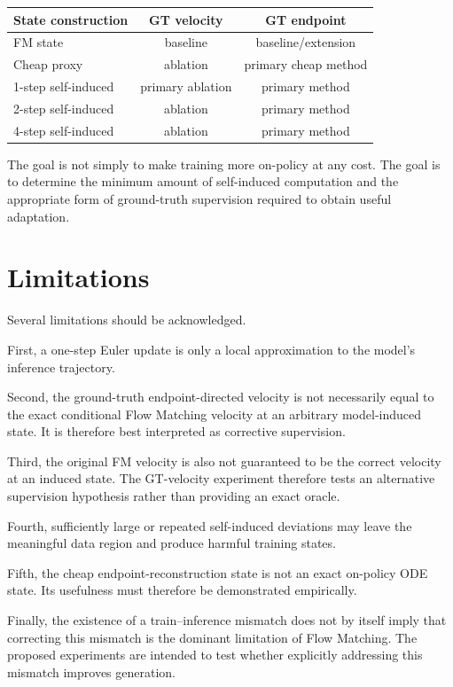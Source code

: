 \documentclass[11pt]{article}
\begin{document}
\begin{center}
\begin{tabular}{l c c}
\toprule
State construction & GT velocity & GT endpoint \\
\midrule
FM state & baseline & baseline/extension \\
Cheap proxy & ablation & primary cheap method \\
1-step self-induced & primary ablation & primary method \\
2-step self-induced & ablation & primary method \\
4-step self-induced & ablation & primary method \\
\bottomrule
\end{tabular}
\end{center}

The goal is not simply to make training more on-policy at any cost. The goal is
to determine the minimum amount of self-induced computation and the appropriate
form of ground-truth supervision required to obtain useful adaptation.

\section{Limitations}

Several limitations should be acknowledged.

First, a one-step Euler update is only a local approximation to the model's
inference trajectory.

Second, the ground-truth endpoint-directed velocity is not necessarily equal
to the exact conditional Flow Matching velocity at an arbitrary model-induced
state. It is therefore best interpreted as corrective supervision.

Third, the original FM velocity is also not guaranteed to be the correct
velocity at an induced state. The GT-velocity experiment therefore tests an
alternative supervision hypothesis rather than providing an exact oracle.

Fourth, sufficiently large or repeated self-induced deviations may leave the
meaningful data region and produce harmful training states.

Fifth, the cheap endpoint-reconstruction state is not an exact on-policy ODE
state. Its usefulness must therefore be demonstrated empirically.

Finally, the existence of a train--inference mismatch does not by itself imply
that correcting this mismatch is the dominant limitation of Flow Matching.
The proposed experiments are intended to test whether explicitly addressing
this mismatch improves generation.
\end{document}

